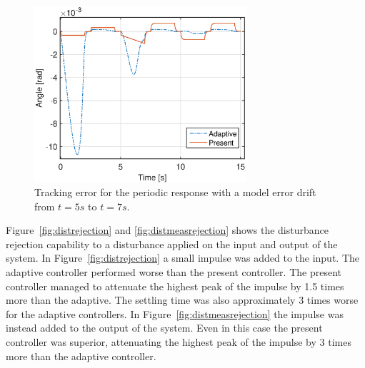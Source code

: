 \begin{figure}[h!]
  \centering
  \includegraphics[width=0.7\textwidth]{fig/matlab/modelerrorperiodic_trackingerror.eps}
  \caption{\label{fig:modelerror_trackingerror} Tracking error for the periodic response with a model error drift from $t=5s$ to $t=7s$.}
\end{figure}

\FloatBarrier
Figure~\ref{fig:distrejection} and \ref{fig:distmeasrejection} shows the disturbance rejection capability to a disturbance applied on the input and output of the system. In Figure~\ref{fig:distrejection} a small impulse was added to the input. The adaptive controller performed worse than the present controller. The present controller managed to attenuate the highest peak of the impulse by 1.5 times more than the adaptive. The settling time was also approximately 3 times worse for the adaptive controllers. In Figure~\ref{fig:distmeasrejection} the impulse was instead added to the output of the system. Even in this case the present controller was superior, attenuating the highest peak of the impulse by 3 times more than the adaptive controller.

